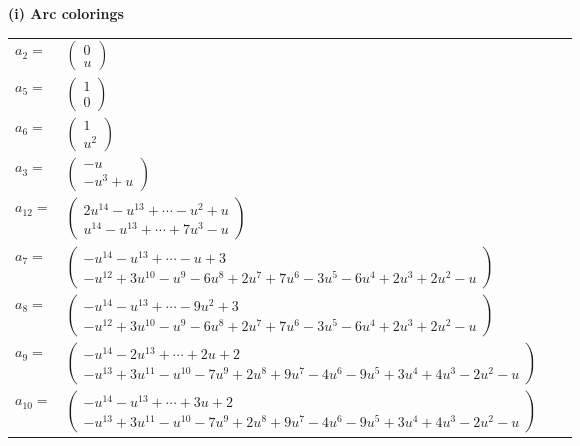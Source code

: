\documentclass[1p]{elsarticle_modified}
\theoremstyle{definition}
\begin{document}
\flushleft \textbf{(i) Arc colorings}\\
\begin{tabular}{m{7pt} m{180pt} m{7pt} m{180pt} }
\flushright $a_{2}=$&$\begin{pmatrix}0\\u\end{pmatrix}$ \\
\flushright $a_{5}=$&$\begin{pmatrix}1\\0\end{pmatrix}$ \\
\flushright $a_{6}=$&$\begin{pmatrix}1\\u^2\end{pmatrix}$ \\
\flushright $a_{3}=$&$\begin{pmatrix}- u\\- u^3+u\end{pmatrix}$ \\
\flushright $a_{12}=$&$\begin{pmatrix}2 u^{14}- u^{13}+\cdots- u^2+u\\u^{14}- u^{13}+\cdots+7 u^3- u\end{pmatrix}$ \\
\flushright $a_{7}=$&$\begin{pmatrix}- u^{14}- u^{13}+\cdots- u+3\\- u^{12}+3 u^{10}- u^9-6 u^8+2 u^7+7 u^6-3 u^5-6 u^4+2 u^3+2 u^2- u\end{pmatrix}$ \\
\flushright $a_{8}=$&$\begin{pmatrix}- u^{14}- u^{13}+\cdots-9 u^2+3\\- u^{12}+3 u^{10}- u^9-6 u^8+2 u^7+7 u^6-3 u^5-6 u^4+2 u^3+2 u^2- u\end{pmatrix}$ \\
\flushright $a_{9}=$&$\begin{pmatrix}- u^{14}-2 u^{13}+\cdots+2 u+2\\- u^{13}+3 u^{11}- u^{10}-7 u^9+2 u^8+9 u^7-4 u^6-9 u^5+3 u^4+4 u^3-2 u^2- u\end{pmatrix}$ \\
\flushright $a_{10}=$&$\begin{pmatrix}- u^{14}- u^{13}+\cdots+3 u+2\\- u^{13}+3 u^{11}- u^{10}-7 u^9+2 u^8+9 u^7-4 u^6-9 u^5+3 u^4+4 u^3-2 u^2- u\end{pmatrix}$ \\

\end{tabular}
\end{document}
